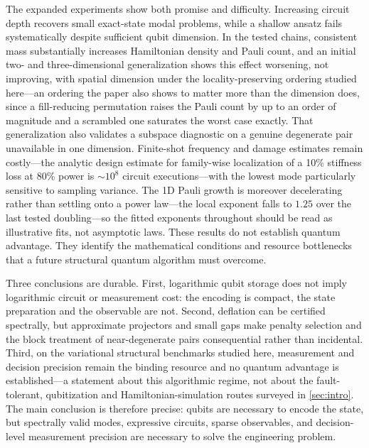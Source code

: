 \documentclass{ieeeaccess}
\begin{document}
The expanded experiments show both promise and difficulty. Increasing circuit depth recovers small exact-state modal problems, while a shallow ansatz fails systematically despite sufficient qubit dimension. In the tested chains, consistent mass substantially increases Hamiltonian density and Pauli count, and an initial two- and three-dimensional generalization shows this effect worsening, not improving, with spatial dimension under the locality-preserving ordering studied here---an ordering the paper also shows to matter more than the dimension does, since a fill-reducing permutation raises the Pauli count by up to an order of magnitude and a scrambled one saturates the worst case exactly. That generalization also validates a subspace diagnostic on a genuine degenerate pair unavailable in one dimension. Finite-shot frequency and damage estimates remain costly---the analytic design estimate for family-wise localization of a 10\% stiffness loss at 80\% power is ${\sim}10^{8}$ circuit executions---with the lowest mode particularly sensitive to sampling variance. The 1D Pauli growth is moreover decelerating rather than settling onto a power law---the local exponent falls to $1.25$ over the last tested doubling---so the fitted exponents throughout should be read as illustrative fits, not asymptotic laws. These results do not establish quantum advantage. They identify the mathematical conditions and resource bottlenecks that a future structural quantum algorithm must overcome.

Three conclusions are durable. First, logarithmic qubit storage does not imply logarithmic circuit or measurement cost: the encoding is compact, the state preparation and the observable are not. Second, deflation can be certified spectrally, but approximate projectors and small gaps make penalty selection and the block treatment of near-degenerate pairs consequential rather than incidental. Third, on the variational structural benchmarks studied here, measurement and decision precision remain the binding resource and no quantum advantage is established---a statement about this algorithmic regime, not about the fault-tolerant, qubitization and Hamiltonian-simulation routes surveyed in \cref{sec:intro}. The main conclusion is therefore precise: qubits are necessary to encode the state, but spectrally valid modes, expressive circuits, sparse observables, and decision-level measurement precision are necessary to solve the engineering problem.
\end{document}
